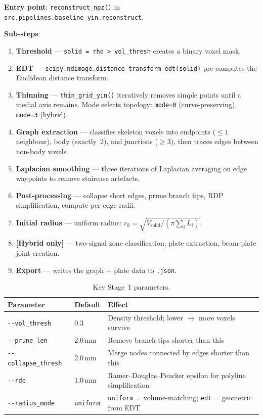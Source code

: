 \documentclass[a4paper, 11pt, openany]{report}
\begin{document}
\textbf{Entry point}: \texttt{reconstruct\_npz()} in
\texttt{src.pipelines.baseline\_yin.reconstruct}.

\textbf{Sub-steps}:
\begin{enumerate}[nosep]
    \item \textbf{Threshold} --- \texttt{solid = rho > vol\_thresh} creates a
          binary voxel mask.
    \item \textbf{EDT} --- \texttt{scipy.ndimage.distance\_transform\_edt(solid)}
          pre-computes the Euclidean distance transform.
    \item \textbf{Thinning} --- \texttt{thin\_grid\_yin()} iteratively removes
          simple points until a medial axis remains.  Mode selects topology:
          \texttt{mode=0} (curve-preserving), \texttt{mode=3} (hybrid).
    \item \textbf{Graph extraction} --- classifies skeleton voxels into endpoints
          ($\le 1$ neighbour), body (exactly~2), and junctions ($\ge 3$), then traces
          edges between non-body voxels.
    \item \textbf{Laplacian smoothing} --- three iterations of Laplacian averaging
          on edge waypoints to remove staircase artefacts.
    \item \textbf{Post-processing} --- collapse short edges, prune branch tips,
          RDP simplification, compute per-edge radii.
    \item \textbf{Initial radius} --- uniform radius:
          $r_0 = \sqrt{V_{\text{solid}} / (\pi \sum_i L_i)}$.
    \item \textbf{[Hybrid only]} --- two-signal zone classification, plate
          extraction, beam-plate joint creation.
    \item \textbf{Export} --- writes the graph + plate data to \texttt{.json}.
\end{enumerate}

\begin{table}[htbp]
\caption{Key Stage~1 parameters.}
\label{tab:stage1-params}
\centering
\begin{tabularx}{\textwidth}{llX}
\toprule
Parameter & Default & Effect \\
\midrule
\texttt{-{}-vol\_thresh} & 0.3 & Density threshold; lower $\to$ more voxels survive \\
\texttt{-{}-prune\_len} & 2.0\,mm & Remove branch tips shorter than this \\
\texttt{-{}-collapse\_thresh} & 2.0\,mm & Merge nodes connected by edges shorter than this \\
\texttt{-{}-rdp} & 1.0\,mm & Ramer--Douglas--Peucker epsilon for polyline simplification \\
\texttt{-{}-radius\_mode} & \texttt{uniform} & \texttt{uniform} = volume-matching; \texttt{edt} = geometric from EDT \\
\bottomrule
\end{tabularx}
\end{table}
\end{document}
